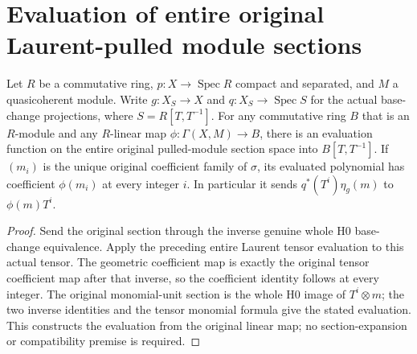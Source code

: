 \section{Evaluation of entire original Laurent-pulled module sections}

\begin{definition}\label{def:fc-scheme-module-laurent-evaluation}
\leanok
{}
Let $R$ be a commutative ring, $p:X\to\operatorname{Spec}R$ compact
and separated, and $M$ a quasicoherent module. Write $g:X_S\to X$
and $q:X_S\to\operatorname{Spec}S$ for the actual base-change projections,
where $S=R[T,T^{-1}]$. For any commutative ring $B$ that is an
$R$-module and any $R$-linear map $\phi:\Gamma(X,M)\to B$, there is
an evaluation function on the entire original pulled-module section
space into $B[T,T^{-1}]$. If $(m_i)$ is the unique original coefficient
family of $\sigma$, its evaluated polynomial has coefficient
$\phi(m_i)$ at every integer $i$. In particular it sends
$q^*(T^i)\eta_g(m)$ to $\phi(m)T^i$.
\end{definition}
\begin{proof}
Send the original section through the inverse genuine whole H0
base-change equivalence. Apply the preceding entire Laurent tensor
evaluation to this actual tensor. The geometric coefficient map is
exactly the original tensor coefficient map after that inverse, so
the coefficient identity follows at every integer. The original
monomial-unit section is the whole H0 image of $T^i\otimes m$;
the two inverse identities and the tensor monomial formula give
the stated evaluation. This constructs the evaluation from the
original linear map; no section-expansion or compatibility premise
is required.
\end{proof}

